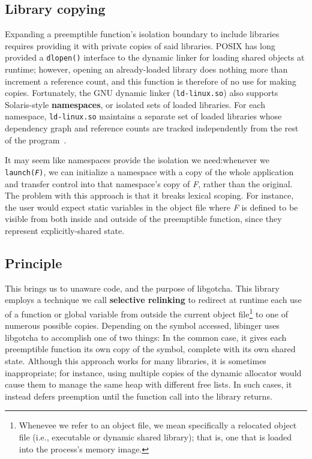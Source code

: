 \subsection{Library copying}

Expanding a preemptible function's isolation boundary to include libraries requires
providing it with private copies of said libraries.  POSIX has long provided a
\texttt{dlopen()} interface to the dynamic linker for loading shared objects at
runtime; however, opening an already-loaded library does nothing more than increment
a reference count, and this function is therefore of no use for making copies.
Fortunately, the GNU dynamic linker (\texttt{ld-linux.so}) also supports
Solaris-style \textbf{namespaces}, or isolated sets of loaded libraries.  For each
namespace, \texttt{ld-linux.so} maintains a separate set of loaded libraries whose
dependency graph and reference counts are tracked independently from the rest of the
program~\cite{dlmopen-manpage}.

It may seem like namespaces provide the isolation we need:\@ whenever we
\texttt{launch(\textnormal{\textit{F}})}, we can initialize a namespace with a copy
of the whole application and transfer control into that namespace's copy of
\textit{F}, rather than the original.  The problem with this approach is that it
breaks lexical scoping.  For instance, the user would expect static variables in the
object file where \textit{F} is defined to be visible from both inside and outside of
the preemptible function, since they represent explicitly-shared state.


\subsection{Principle}

This brings us to unaware code, and the purpose of libgotcha.  This library employs
a technique we call \textbf{selective relinking} to redirect at runtime each use of a
function or global variable from outside the current object file\footnote{Whenevee we
refer to an object file, we mean specifically a relocated object file (i.e.,
executable or dynamic shared library); that is, one that is loaded into the process's
memory image.} to one of numerous possible copies.  Depending on the symbol accessed,
libinger uses libgotcha to accomplish one of two things:  In the common case, it
gives each preemptible function its own copy of the symbol, complete with its own
shared state.  Although this approach works for many libraries, it is sometimes
inappropriate; for instance, using multiple copies of the dynamic allocator would
cause them to manage the same heap with different free lists.  In such cases, it
instead defers preemption until the function call into the library returns.

